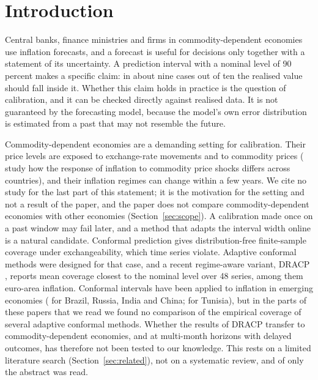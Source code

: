 \section{Introduction}\label{sec:intro}

Central banks, finance ministries and firms in commodity-dependent economies use inflation forecasts, and a forecast is useful for decisions only together with a statement of its uncertainty. A prediction interval with a nominal level of 90 percent makes a specific claim: in about nine cases out of ten the realised value should fall inside it. Whether this claim holds in practice is the question of calibration, and it can be checked directly against realised data. It is not guaranteed by the forecasting model, because the model's own error distribution is estimated from a past that may not resemble the future.

Commodity-dependent economies are a demanding setting for calibration. Their price levels are exposed to exchange-rate movements and to commodity prices (\citealp{gelos2017commodity} study how the response of inflation to commodity price shocks differs across countries), and their inflation regimes can change within a few years. We cite no study for the last part of this statement; it is the motivation for the setting and not a result of the paper, and the paper does not compare commodity-dependent economies with other economies (Section~\ref{sec:scope}). A calibration made once on a past window may fail later, and a method that adapts the interval width online is a natural candidate. Conformal prediction \citep{vovk2005algorithmic} gives distribution-free finite-sample coverage under exchangeability, which time series violate. Adaptive conformal methods \citep{gibbs2021aci,gibbs2024faci,angelopoulos2023pid,bhatnagar2023saocp} were designed for that case, and a recent regime-aware variant, DRACP \citep{oancea2026dracp}, reports mean coverage closest to the nominal level over 48 series, among them euro-area inflation. Conformal intervals have been applied to inflation in emerging economies (\citealp{sengupta2025fewnet} for Brazil, Russia, India and China; \citealp{brahem2026tunisia} for Tunisia), but in the parts of these papers that we read we found no comparison of the empirical coverage of several adaptive conformal methods. Whether the results of DRACP transfer to commodity-dependent economies, and at multi-month horizons with delayed outcomes, has therefore not been tested to our knowledge. This rests on a limited literature search (Section~\ref{sec:related}), not on a systematic review, and of \citet{brahem2026tunisia} only the abstract was read.


